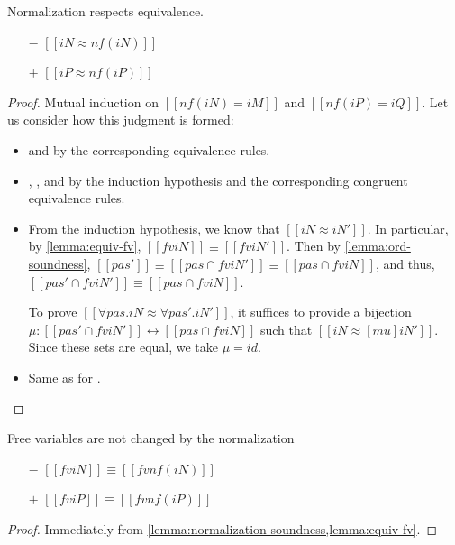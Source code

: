 

\begin{lemma}
  \label{lemma:normalization-soundness}
  Normalization respects equivalence.

  \begin{itemize}
    \item[$-$] $[[iN ≈ nf(iN)]]$
    \item[$+$] $[[iP ≈ nf(iP)]]$
  \end{itemize}

\end{lemma}
\begin{proof}
  Mutual induction on $[[nf(iN) = iM]]$ and $[[nf(iP) = iQ]]$.
  Let us consider how this judgment is formed:
  \begin{itemize}
    \item{\nameref{\ottdruleNrmNVarLabel} and \nameref{\ottdruleNrmPVarLabel}} by
      the corresponding equivalence rules.
    \item{\nameref{\ottdruleNrmShiftULabel}, \nameref{\ottdruleNrmShiftDLabel},
        and \nameref{\ottdruleNrmArrowLabel}} by the induction hypothesis and
      the corresponding congruent equivalence rules.
    \item{\nameref{\ottdruleNrmForallLabel}} From the induction hypothesis, we
      know that $[[iN ≈ iN']]$. In particular, by \cref{lemma:equiv-fv}, $[[fv
      iN]] \equiv [[fv iN']]$. Then by \cref{lemma:ord-soundness}, $[[pas']]
      \equiv [[pas ∩ fv iN']] \equiv [[pas ∩ fv iN]]$, and thus,
      $[[pas' ∩ fv iN']] \equiv [[pas ∩ fv iN]]$.
      
      To prove $[[∀pas.iN ≈ ∀pas'.iN']]$, it suffices to provide a bijection 
      $\mu : [[pas' ∩ fv iN']] \leftrightarrow [[pas ∩ fv iN]]$ such that
      $[[iN ≈ [mu]iN']]$. Since these sets are equal, we take $\mu = id$.
    \item{\nameref{\ottdruleNrmExistsLabel}} Same as for \nameref{\ottdruleNrmForallLabel}.
  \end{itemize}
\end{proof}

\begin{corollary}
  \label{corollary:fv-nf}
  Free variables are not changed by the normalization
  \begin{itemize}
  \item[$-$] $[[fv iN]] \equiv [[fv nf(iN)]]$
  \item[$+$] $[[fv iP]] \equiv [[fv nf(iP)]]$
  \end{itemize}
\end{corollary}
\begin{proof}
  Immediately from \cref{lemma:normalization-soundness,lemma:equiv-fv}.
\end{proof}
